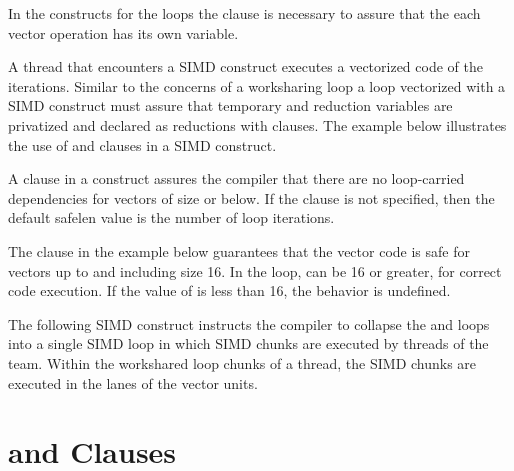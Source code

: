 In the  constructs for the loops the  clause is 
necessary to assure that the each vector operation has its own  
variable.



{}
A thread that encounters a SIMD construct executes a vectorized code of the 
iterations. Similar to the concerns of a worksharing loop a loop vectorized 
with a SIMD construct must assure that temporary and reduction variables are 
privatized and declared as reductions with clauses.  The example below 
illustrates the use of  and  clauses in a SIMD 
construct.




{}
A  clause in a  construct assures the compiler that 
there are no loop-carried dependencies for vectors of size  or below. If 
the  clause is not specified, then the default safelen value is 
the number of loop iterations.
 
The  clause in the example below guarantees that the vector 
code is safe for vectors up to and including size 16.  In the loop,  can 
be 16 or greater, for correct code execution.  If the value of  is less 
than 16, the behavior is undefined.



{}
The following SIMD construct instructs the compiler to collapse the  and 
 loops into a single SIMD loop in which SIMD chunks are executed by 
threads of the team. Within the workshared loop chunks of a thread, the SIMD 
chunks are executed in the lanes of the vector units.




\section{ and  Clauses}
\label{sec:SIMD_branch}

